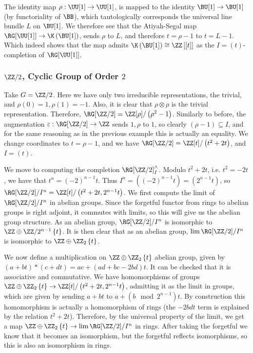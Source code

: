The identity map $\rho: \UU[1] \to \UU[1]$, is mapped to the identity $\BU[1] \to \BU[1]$ (by functoriality of $\BB$), which tautologically corresponds the universal line bundle $L$ on $\BU[1]$.
We therefore see that the Atiyah-Segal map $\RG[\UU[1]] \to \K\left(\BU[1]\right)$, sends $\rho$ to $L$, and therefore $t = \rho - 1$ to $t = L - 1$.
Which indeed shows that the map admits $\K\left(\BU[1]\right) \cong \ZZ\left[\left[t\right]\right]$ as the $I = \left(t\right)$-completion of $\RG[\UU[1]]$.


\subsubsection{\texorpdfstring{$\ZZ/2$}{Z/2}, Cyclic Group of Order \texorpdfstring{$2$}{2}}

Take $G = \ZZ/2$.
Here we have only two irreducible representations, the trivial, and $\rho\left(0\right) = 1, \rho\left(1\right) = -1$.
Also, it is clear that $\rho \otimes \rho$ is the trivial representation.
Therefore, $\RG[\ZZ/2] = \ZZ[\rho]/\left(\rho^2-1\right)$.
Similarly to before, the augmentation $\varepsilon: \RG[\ZZ/2] \to \ZZ$ sends $1,\rho$ to $1$, so clearly $\left(\rho-1\right) \subseteq I$, and for the same reasoning as in the previous example this is actually an equality.
We change coordinates to $t = \rho-1$, and we have $\RG[\ZZ/2] = \ZZ[t]/\left(t^2+2t\right)$, and $I = \left(t\right)$.

We move to computing the completion $\RG[\ZZ/2]_I^\wedge$.
Modulo $t^2+2t$, i.e. $t^2 = -2t$, we have that $t^n = \left(-2\right)^{n-1} t$.
Thus $I^n = \left(\left(-2\right)^{n-1} t\right) = \left(2^{n-1} t\right)$, so $\RG[\ZZ/2]/I^n = \ZZ[t]/\left(t^2+2t, 2^{n-1} t\right)$.
We first compute the limit of $\RG[\ZZ/2]/I^n$ in abelian groups.
Since the forgetful functor from rings to abelian groups is right adjoint, it commutes with limits, so this will give us the abelian group structure.
As an abelian group, $\RG[\ZZ/2]/I^n$ is isomorphic to $\ZZ \oplus \ZZ/2^{n-1}\left\{t\right\}$.
It is then clear that as an abelian group, $\lim \RG[\ZZ/2]/I^n$ is isomorphic to $\ZZ \oplus \ZZ_2\left\{t\right\}$.

We now define a multiplication on $\ZZ \oplus \ZZ_2\left\{t\right\}$ abelian group, given by $\left(a+bt\right) * \left(c+dt\right) = ac + (ad+bc-2bd)t$.
It can be checked that it is associative and commutative.
We have homomorphisms of groups $\ZZ \oplus \ZZ_2\left\{t\right\} \to \ZZ[t]/\left(t^2+2t, 2^{n-1} t\right)$, admitting it as the limit in groups, which are given by sending $a+bt$ to $a+\left(b \mod 2^{n-1}\right) t$.
By construction this homomorphism is actually a homomorphism of rings (the $-2bdt$ term is explained by the relation $t^2+2t$).
Therefore, by the universal property of the limit, we get a map $\ZZ \oplus \ZZ_2\left\{t\right\} \to \lim \RG[\ZZ/2]/I^n$ in rings.
After taking the forgetful we know that it becomes an isomorphism, but the forgetful reflects isomorphisms, so this is also an isomorphism in rings.

